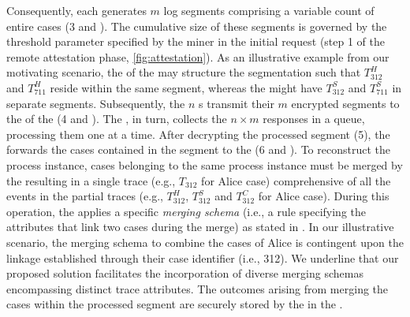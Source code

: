 Consequently, each  generates $m$ log segments comprising a variable count of entire cases (3 and ). The cumulative size of these segments is governed by the threshold parameter specified by the miner in the initial request (step 1 of the remote attestation phase, \cref{fig:attestation}). As an illustrative example from our motivating scenario, the  of the  may structure the segmentation such that $T^H_{312}$ and $T^H_{711}$ reside within the same segment, whereas the  might have $T^S_{312}$ and $T^S_{711}$ in separate segments. Subsequently, the $n$ s transmit their $m$ encrypted segments to the  of the  (4 and ). The , in turn, collects the $n \times m$ responses in a queue, processing them one at a time. After decrypting the processed segment (5), the  forwards the cases contained in the segment to the  (6 and ). To reconstruct the process instance, cases belonging to the same process instance must be merged by the  resulting in a single trace (e.g., $T_{312}$ for Alice case) comprehensive of all the events in the partial traces (e.g., $T^H_{312}$, $T^S_{312}$ and $T^C_{312}$ for Alice case). During this operation, the  applies a specific \textit{merging schema} (i.e., a rule specifying the attributes that link two cases during the merge) as stated in \citep{claes2014merging}. In our illustrative scenario, the merging schema to combine the cases of Alice is contingent upon the linkage established through their case identifier (i.e., 312). We underline that our proposed solution facilitates the incorporation of diverse merging schemas encompassing distinct trace attributes. The outcomes arising from merging the cases within the processed segment are securely stored by the  in the .

